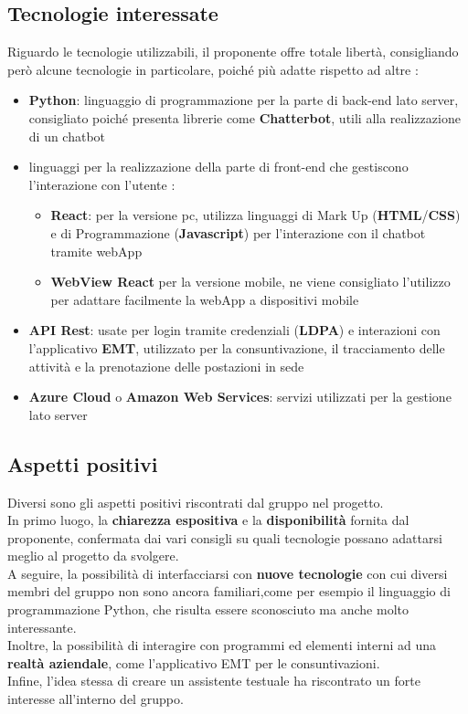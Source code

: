 \subsection{Tecnologie interessate}
Riguardo le tecnologie utilizzabili, il proponente offre totale libertà, consigliando però alcune tecnologie in particolare, poiché più adatte rispetto ad altre :
\begin{itemize}
	\item \textbf{Python}: linguaggio di programmazione per la parte di back-end lato server, consigliato poiché presenta librerie come \textbf{Chatterbot}, utili alla realizzazione di un chatbot
	\item linguaggi per la realizzazione della parte di front-end che gestiscono l'interazione con l'utente : 
	\begin{itemize}
		\item \textbf{React}: per la versione pc, utilizza linguaggi di Mark Up (\textbf{HTML}/\textbf{CSS}) e di Programmazione (\textbf{Javascript}) per l'interazione con il chatbot tramite webApp
		\item \textbf{WebView React} per la versione mobile, ne viene consigliato l'utilizzo per adattare facilmente la webApp a dispositivi mobile
	\end{itemize}
	\item \textbf{API Rest}: usate per login tramite credenziali (\textbf{LDPA}) e interazioni con l'applicativo \textbf{EMT}, utilizzato per la consuntivazione, il tracciamento delle attività e la prenotazione delle postazioni in sede 
	\item \textbf{Azure Cloud} o \textbf{Amazon Web Services}: servizi utilizzati per la gestione lato server
\end{itemize}

\subsection{Aspetti positivi}
Diversi sono gli aspetti positivi riscontrati dal gruppo nel progetto.
\\In primo luogo, la \textbf{chiarezza espositiva} e la \textbf{disponibilità} fornita dal proponente, confermata dai vari consigli su quali tecnologie possano adattarsi meglio al progetto da svolgere. 
\\A seguire, la possibilità di interfacciarsi con \textbf{nuove tecnologie} con cui diversi membri del gruppo non sono ancora familiari,come per esempio il linguaggio di programmazione Python, che risulta essere sconosciuto ma anche molto interessante. 
\\Inoltre, la possibilità di interagire con programmi ed elementi interni ad una \textbf{realtà aziendale}, come l'applicativo EMT per le consuntivazioni. 
\\Infine, l'idea stessa di creare un assistente testuale ha
riscontrato un forte interesse all'interno del gruppo.
